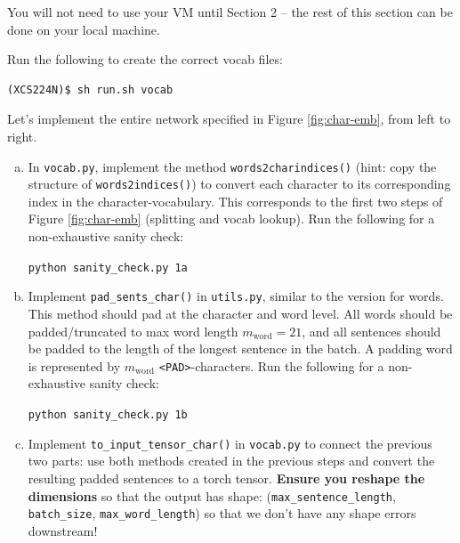 You will not need to use your VM until Section 2 -- the rest of this section can be done on your local machine.

Run the following to create the correct vocab files:
\begin{lstlisting}
(XCS224N)$ sh run.sh vocab
\end{lstlisting}

Let's implement the entire network specified in Figure \ref{fig:char-emb}, from left to right.

\begin{enumerate}[(a)]
    \item {} In \texttt{vocab.py}, implement the method \texttt{words2charindices()} (hint: copy the structure of \texttt{words2indices()}) to convert each character to its corresponding index in the character-vocabulary. This corresponds to the first two steps of Figure \ref{fig:char-emb} (splitting and vocab lookup). Run the following for a non-exhaustive sanity check:
    \begin{center}
        \texttt{python sanity\_check.py 1a}
    \end{center}

    \item {} Implement \texttt{pad\_sents\_char()} in \texttt{utils.py}, similar to the version for words. This method should pad at the character and word level. 
    All words should be padded/truncated to max word length $m_\text{word}=21$, and all sentences should be padded to the length of the longest sentence in the batch.
    A padding word is represented by $m_\text{word}$ \texttt{<PAD>}-characters.
    Run the following for a non-exhaustive sanity check:
    \begin{center}
        \texttt{python sanity\_check.py 1b}
    \end{center}

    \item {} Implement \texttt{to\_input\_tensor\_char()} in \texttt{vocab.py} to connect the previous two parts: use both methods created in the previous steps and convert the resulting padded sentences to a torch tensor. \textbf{Ensure you reshape the dimensions} so that the output has shape: (\texttt{max\_sentence\_length}, \texttt{batch\_size}, \texttt{max\_word\_length}) so that we don't have any shape errors downstream! 


\end{enumerate}
